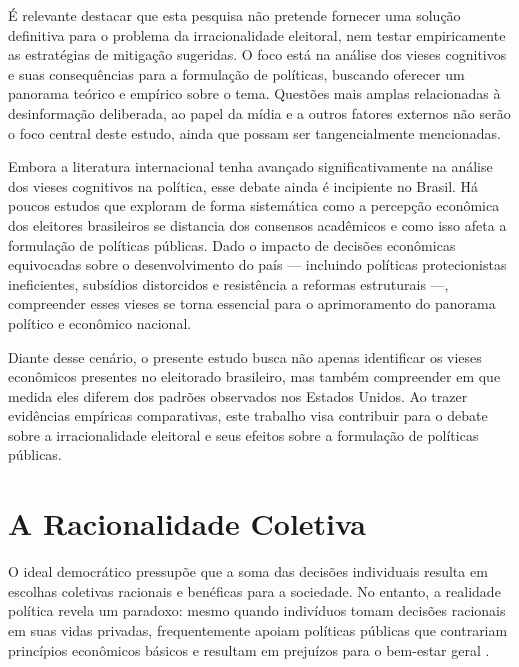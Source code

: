 É relevante destacar que esta pesquisa não pretende fornecer uma solução definitiva para o problema da irracionalidade eleitoral, nem testar empiricamente as estratégias de mitigação sugeridas. O foco está na análise dos vieses cognitivos e suas consequências para a formulação de políticas, buscando oferecer um panorama teórico e empírico sobre o tema. Questões mais amplas relacionadas à desinformação deliberada, ao papel da mídia e a outros fatores externos não serão o foco central deste estudo, ainda que possam ser tangencialmente mencionadas.

Embora a literatura internacional tenha avançado significativamente na análise dos vieses cognitivos na política, esse debate ainda é incipiente no Brasil. Há poucos estudos que exploram de forma sistemática como a percepção econômica dos eleitores brasileiros se distancia dos consensos acadêmicos e como isso afeta a formulação de políticas públicas. Dado o impacto de decisões econômicas equivocadas sobre o desenvolvimento do país — incluindo políticas protecionistas ineficientes, subsídios distorcidos e resistência a reformas estruturais —, compreender esses vieses se torna essencial para o aprimoramento do panorama político e econômico nacional.

Diante desse cenário, o presente estudo busca não apenas identificar os vieses econômicos presentes no eleitorado brasileiro, mas também compreender em que medida eles diferem dos padrões observados nos Estados Unidos. Ao trazer evidências empíricas comparativas, este trabalho visa contribuir para o debate sobre a irracionalidade eleitoral e seus efeitos sobre a formulação de políticas públicas.


\section{A Racionalidade Coletiva} %


O ideal democrático pressupõe que a soma das decisões individuais resulta em escolhas coletivas racionais e benéficas para a sociedade. No entanto, a realidade política revela um paradoxo: mesmo quando indivíduos tomam decisões racionais em suas vidas privadas, frequentemente apoiam políticas públicas que contrariam princípios econômicos básicos e resultam em prejuízos para o bem-estar geral \cite{downs1957economic,The_Myth_of_the_Rational_Voter}.

